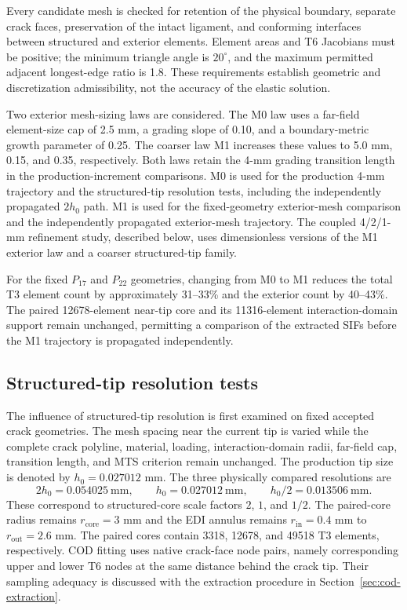 \documentclass[pdflatex,sn-mathphys-num]{sn-jnl}
\begin{document}
Every candidate mesh is checked for retention of the physical boundary,
separate crack faces, preservation of the intact ligament, and conforming
interfaces between structured and exterior elements. Element areas and
T6 Jacobians must be positive; the minimum triangle angle is
$20^\circ$, and the maximum permitted adjacent longest-edge ratio is 1.8.
These requirements establish geometric and discretization
admissibility, not the accuracy of the elastic solution.

Two exterior mesh-sizing laws are considered. The M0 law uses a far-field element-size cap of 2.5 mm, a grading
slope of 0.10, and a boundary-metric growth parameter of 0.25.
The coarser law M1 increases these values to 5.0 mm, 0.15, and
0.35, respectively. Both laws retain the 4-mm grading transition
length in the production-increment comparisons. M0 is used for
the production 4-mm trajectory and the structured-tip resolution
tests, including the independently propagated $2h_0$ path.
M1 is used for the fixed-geometry exterior-mesh comparison
and the independently propagated exterior-mesh trajectory.
The coupled 4/2/1-mm refinement study, described below,
uses dimensionless versions of the M1 exterior law and a
coarser structured-tip family.

For the fixed $P_{17}$ and $P_{22}$ geometries, changing
from M0 to M1 reduces the total T3 element count by
approximately 31--33\% and the exterior count by 40--43\%.
The paired 12678-element near-tip core and its 11316-element
interaction-domain support remain unchanged, permitting a
comparison of the extracted SIFs before the M1 trajectory
is propagated independently.

\subsection{Structured-tip resolution tests}
The influence of structured-tip resolution is first examined on fixed
accepted crack geometries. The mesh spacing near the current tip is
varied while the complete crack polyline, material, loading,
interaction-domain radii, far-field cap, transition length, and MTS
criterion remain unchanged.
The production tip size is denoted by $h_0=0.027012$ mm. The three
physically compared resolutions are
\begin{equation}
 2h_0=0.054025\ \mathrm{mm},\qquad
 h_0=0.027012\ \mathrm{mm},\qquad
 h_0/2=0.013506\ \mathrm{mm}.
 \label{eq:tiplevels}
\end{equation}
These correspond to structured-core scale factors $2$, $1$, and $1/2$.
The paired-core radius remains $r_{\mathrm{core}}=3$ mm and the EDI annulus remains
$r_{\mathrm{in}}=0.4$ mm to $r_{\mathrm{out}}=2.6$ mm. The paired cores contain 3318, 12678, and
49518 T3 elements, respectively. COD fitting uses native crack-face
node pairs, namely corresponding upper and lower T6 nodes at the same
distance behind the crack tip. Their sampling adequacy is discussed
with the extraction procedure in Section~\ref{sec:cod-extraction}.
\end{document}
